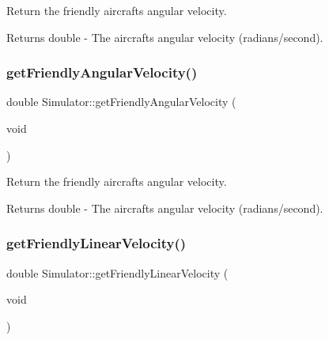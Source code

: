Return the friendly aircraft\textquotesingle{}s angular velocity. 

\begin{DoxyReturn}{Returns}
double -\/ The aircraft\textquotesingle{}s angular velocity (radians/second). 
\end{DoxyReturn}
\mbox{\label{classSimulator_a054241a50cbf232b71acdaf4290855d3}} 
\subsubsection{\texorpdfstring{get\+Friendly\+Angular\+Velocity()}{getFriendlyAngularVelocity()}\hspace{0.1cm}{\footnotesize\ttfamily [2/2]}}
{\footnotesize\ttfamily double Simulator\+::get\+Friendly\+Angular\+Velocity (\begin{DoxyParamCaption}\item[{void}]{ }\end{DoxyParamCaption})}



Return the friendly aircraft\textquotesingle{}s angular velocity. 

\begin{DoxyReturn}{Returns}
double -\/ The aircraft\textquotesingle{}s angular velocity (radians/second). 
\end{DoxyReturn}
\mbox{\label{classSimulator_a17d07e629ef87450d91d960c2e6b231e}} 
\subsubsection{\texorpdfstring{get\+Friendly\+Linear\+Velocity()}{getFriendlyLinearVelocity()}\hspace{0.1cm}{\footnotesize\ttfamily [1/2]}}
{\footnotesize\ttfamily double Simulator\+::get\+Friendly\+Linear\+Velocity (\begin{DoxyParamCaption}\item[{void}]{ }\end{DoxyParamCaption})}




